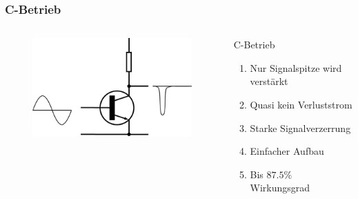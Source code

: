\begin{frame}
  \frametitle{C-Betrieb}
  \begin{columns}[c]
    \begin{center}
      \begin{figure}
        \includegraphics[width=1\textwidth,height=.8\textheight,keepaspectratio]{a07/electronic_amplifier_class_c.png}
      \end{figure}
    \end{center}
     \large
    \begin{block}{C-Betrieb}
      \begin{enumerate}
        \item Nur Signalspitze wird verstärkt
        \item Quasi kein Verluststrom
        \item Starke Signalverzerrung
        \item Einfacher Aufbau
        \item Bis $87.5\%$ Wirkungsgrad
      \end{enumerate}
    \end{block}
  \end{columns}
\end{frame}

